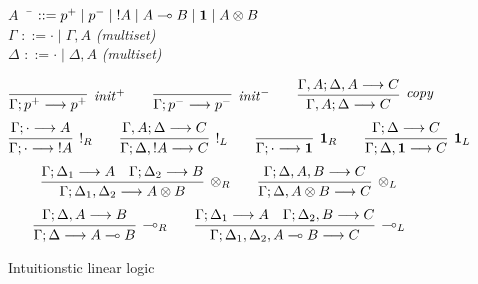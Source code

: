 \begin{figure}[t]
\begin{tabbing}
\quad $A$ \,\, \=  $::= p^+ \mid p^- \mid {!}A \mid A \multimap B \mid \mathbf{1} \mid A \otimes B$\\
\quad $\Gamma$ \> $::= \cdot \mid \Gamma, A$ \qquad \= {\it (multiset)}\\
\quad $\Delta$ \> $::= \cdot \mid \Delta, A$ \> {\it (multiset)}\\
\end{tabbing}
%
%
\quad {}
\[
\infer[{\it init}^+]
{\seq{\Gamma}{p^+}{p^+}}
{}
\qquad
\infer[{\it init}^-]
{\seq{\Gamma}{p^-}{p^-}}
{}
\qquad
\infer[{\it copy}]
{\seq{\Gamma, A}{\Delta}{C}}
{\seq{\Gamma, A}{\Delta, A}{C}}
%
\]\[
%
\infer[{!}_R]
{\seq{\Gamma}{\cdot}{{!}A}}
{\seq{\Gamma}{\cdot}{A}}
\qquad
\infer[{!}_L]
{\seq{\Gamma}{\Delta, {!}A}{C}}
{\seq{\Gamma, A}{\Delta}{C}}
\qquad
\infer[\one_R]
{\seq{\Gamma}{\cdot}{\one}}
{}
\qquad
\infer[\one_L]
{\seq{\Gamma}{\Delta, \one}{C}}
{\seq{\Gamma}{\Delta}{C}}
\]\[
%
\infer[{\tensor}_R]
{\seq{\Gamma}{\Delta_1,\Delta_2}{A \tensor B}}
{\seq{\Gamma}{\Delta_1}{A}
 &
 \seq{\Gamma}{\Delta_2}{B}}
\qquad
\infer[{\tensor}_L]
{\seq{\Gamma}{\Delta, A \tensor B}{C}}
{\seq{\Gamma}{\Delta, A, B}{C}}
\]\[
%
\infer[{\lolli}_R]
{\seq{\Gamma}{\Delta}{A \lolli B}}
{\seq{\Gamma}{\Delta, A}{B}}
\qquad
\infer[{\lolli}_L]
{\seq{\Gamma}{\Delta_1,\Delta_2, A \lolli B}{C}}
{\seq{\Gamma}{\Delta_1}{A}
 &
 \seq{\Gamma}{\Delta_2, B}{C}}
%
\]
\caption{Intuitionstic linear logic}
\label{fig:linear}
\end{figure}
